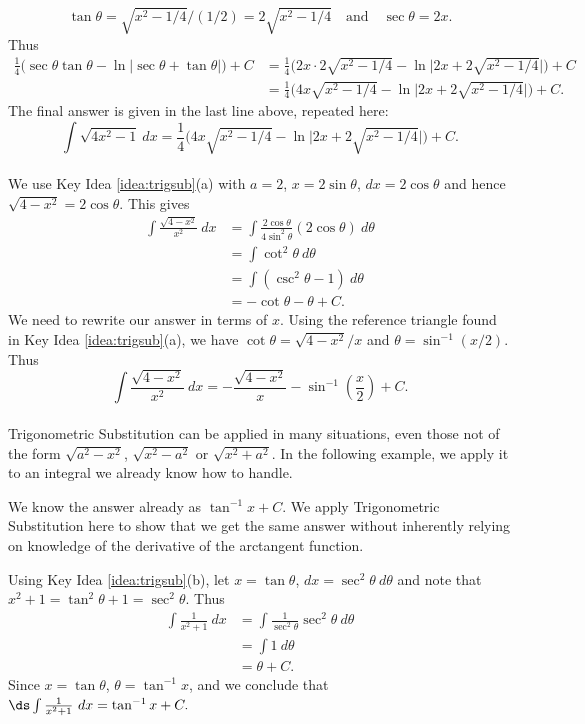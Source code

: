 {$$\tan \theta = \sqrt{x^2-1/4}\Big/(1/2) = 2\sqrt{x^2-1/4}\quad \text{and}\quad \sec\theta = 2x.$$
Thus\small 
\begin{align*}
\frac14\Big(\sec\theta\tan\theta -\ln\big|\sec\theta+\tan\theta\big|\Big)+C &=
				\frac14\Big(2x\cdot 2\sqrt{x^2-1/4} - \ln\big|2x + 2\sqrt{x^2-1/4}\big|\Big)+C\\
				&= \frac14\Big(4x\sqrt{x^2-1/4} - \ln\big|2x + 2\sqrt{x^2-1/4}\big|\Big)+C.
\end{align*}
\normalsize 
The final answer is given in the last line above, repeated here:
$$\int \sqrt{4x^2-1}\ dx = \frac14\Big(4x\sqrt{x^2-1/4} - \ln\big|2x + 2\sqrt{x^2-1/4}\big|\Big)+C.$$
}\\

{We use Key Idea \ref{idea:trigsub}(a) with $a=2$, $x=2\sin \theta$, $dx = 2\cos \theta$ and hence $\sqrt{4-x^2} = 2\cos\theta$. This gives
\begin{align*}
\int \frac{\sqrt{4-x^2}}{x^2}\ dx &= \int \frac{2\cos\theta}{4\sin^2\theta}(2\cos\theta)\ d\theta\\
		&= \int \cot^2\theta\ d\theta\\
		&=	\int (\csc^2\theta -1)\ d\theta\\
		&= -\cot\theta -\theta + C.
\end{align*}
We need to rewrite our answer in terms of $x$. Using the reference triangle found in Key Idea \ref{idea:trigsub}(a), we have $\cot\theta = \sqrt{4-x^2}/x$ and $\theta = \sin^{-1}(x/2)$. Thus
$$\int \frac{\sqrt{4-x^2}}{x^2}\ dx = -\frac{\sqrt{4-x^2}}x-\sin^{-1}\left(\frac x2\right) + C.$$
}\\

Trigonometric Substitution can be applied in many situations, even those not of the form $\sqrt{a^2-x^2}$, $\sqrt{x^2-a^2}$ or $\sqrt{x^2+a^2}$. In the following example, we apply it to an integral we already know how to handle.\\

{We know the answer already as $\tan^{-1}x+C$. We apply Trigonometric Substitution here to show that we get the same answer without inherently relying on knowledge of the derivative of the arctangent function.

Using Key Idea \ref{idea:trigsub}(b), let $x=\tan\theta$, $dx=\sec^2\theta\ d\theta$ and note that $x^2+1 = \tan^2\theta+1 = \sec^2\theta$. Thus
\begin{align*}
\int \frac1{x^2+1}\ dx &= \int \frac{1}{\sec^2\theta}\sec^2\theta\ d\theta \\
			&= \int 1\ d\theta\\
			&= \theta + C.
\end{align*}
Since $x=\tan \theta$, $\theta = \tan^{-1}x$, and we conclude that $\ds \int\frac1{x^2+1}\ dx = \tan^{-1}x+C.$
}\\

